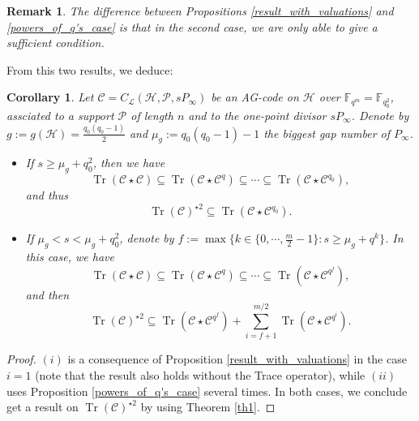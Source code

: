 \documentclass[a4paper]{article}
\newtheorem{coro1}{Corollary}
\newtheorem{rq1}{Remark}
\newcommand{\calP}{\mathcal{P}}
\newcommand{\calH}{\mathcal{H}}
\newcommand{\calL}{\mathcal{L}}
\newcommand{\calC}{\mathcal{C}}
\newcommand{\Tr}{\operatorname{Tr}}
\begin{document}
\newpage


































\begin{rq1}
The difference between Propositions \ref{result_with_valuations} and \ref{powers_of_q's_case} is that in the second case, we are only able to give a sufficient condition.
\end{rq1} 

From this two results, we deduce:

\begin{coro1} \label{coro2}
Let $\calC = C_{\calL}(\calH,\calP,sP_{\infty})$ be an AG-code on $\calH$ over $\mathbb{F}_{q^m}=\mathbb{F}_{q_0^2}$, assciated to a support $\calP$ of length $n$ and to the one-point divisor $sP_{\infty}$. Denote by $g:=g(\calH)=\frac{q_0(q_0-1)}{2}$ and $\mu_g := q_0(q_0-1)-1$ the biggest gap number of $P_{\infty}$. 
\begin{itemize}
    \item[(i)] If $s \geq \mu_g + q_0^2$, then we have 
        \[\Tr(\calC \star \calC) \subseteq \Tr(\calC \star \calC^q) \subseteq \cdots \subseteq \Tr(\calC \star \calC^{q_0}),\]
        and thus 
        \[\Tr(\calC)^{\star 2} \subseteq \Tr(\calC \star \calC^{q_0}).\]
    \item[(ii)] If $\mu_g < s < \mu_g +q_0^2$, denote by $f:= \max\{k \in \{0,\cdots,\frac{m}{2}-1\} : s \geq \mu_g + q^k\}$. In this case, we have 
        \[\Tr(\calC \star \calC) \subseteq \Tr(\calC \star \calC^q) \subseteq \cdots \subseteq \Tr(\calC \star \calC^{q^f}),\]
          and then
        \[\Tr(\calC)^{\star 2} \subseteq \Tr(\calC \star \calC^{q^f}) + \sum\limits_{i=f+1}^{m/2} \Tr(\calC \star \calC^{q^i}).\]
\end{itemize}
\end{coro1}

\begin{proof}
$(i)$ is a consequence of Proposition \ref{result_with_valuations} in the case $i=1$ (note that the result also holds without the Trace operator), while $(ii)$ uses Proposition \ref{powers_of_q's_case} several times. In both cases, we conclude get a result on $\Tr(\calC)^{\star 2}$ by using Theorem \ref{th1}.
\end{proof}
\end{document}
